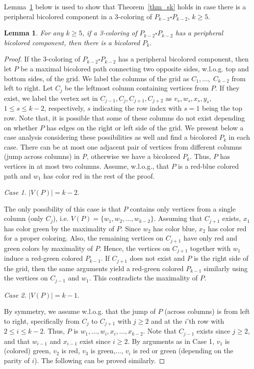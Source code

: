 \documentclass[
final, nomarks
]{dmtcs-episciences}
\newtheorem{lemma}[theorem]{Lemma}
\begin{document}
Lemma~\ref{lem-case1} below is used to show  that Theorem~\ref{thm_sk} holds in case there is  a peripheral bicolored component in a 3-coloring of $P_{k-2}\square P_{k-2}$, $k\geq 5$. 

\begin{lemma}\label{lem-case1}
    For any $k\geq 5$, if a 3-coloring of $P_{k-2}\square P_{k-2}$ has a peripheral bicolored component, then there is a bicolored $P_k$. 
\end{lemma}
\begin{proof}
If the 3-coloring of $P_{k-2}\square P_{k-2}$ has a peripheral bicolored component, then let $P$ be a maximal bicolored path connecting two opposite sides, w.l.o.g. top and bottom sides, of the grid. 
We label the columns of the grid as $C_1,\dots,$ $C_{k-2}$ from left to right. Let $C_j$ be the leftmost column containing vertices from $P$. 
If they exist, we label the vertex set in $C_{j-1}, C_j, C_{j+1}, C_{j+2}$ as $v_s, w_s, x_s, y_s,$ $1\leq s\leq k-2$, respectively, $s$ indicating the row index with $s=1$ being the top row. Note that, it is possible that some of these columns do not exist depending on whether $P$ has edges on the right or left side of the grid. We present below a case analysis considering these possibilities as well and find a bicolored $P_k$ in each case. There can be at most one adjacent pair of vertices from different columns (jump across columns) in {\it P}, otherwise we have a bicolored $P_k.$ Thus, $P$ has vertices in at most two columns. Assume, w.l.o.g., that $P$ is a red-blue colored path and $w_1$ has color red in the rest of the proof.  
 

\noindent
{\it Case 1.} $|V(P)|=k-2.$ 

The only possibility of this case is that $P$ contains only vertices from a single column (only $C_j$), i.e. $V(P)=\{w_1,w_2, \dots, w_{k-2}\}.$ Assuming that $C_{j+1}$ exists, $x_1$ has color green by the maximality of $P$. 
Since $w_2$ has color blue, $x_2$ has color red for a proper coloring. Also, the remaining vertices on $C_{j+1}$ have only red and green colors by maximality of $P$. Hence, the vertices on $C_{j+1}$ together with $w_1$ induce a red-green colored $P_{k-1}$. If $C_{j+1}$ does not exist and $P$ is the right side of the grid, then the same arguments yield a red-green colored $P_{k-1}$ similarly using the vertices on $C_{j-1}$ and $w_1.$ This contradicts the maximality of $P.$ 

\noindent
{\it Case 2.} $|V(P)|=k-1.$ 

By symmetry, we assume w.l.o.g. that the jump of $P$ (across columns) is from left to right, specifically from $C_j$ to $C_{j+1}$ with $j\geq 2$ and at the $i$'th row with $2\leq i\leq k-2.$ Thus, $P$ is $w_1, \dots, w_i, x_i, \dots, x_{k-2}.$ 
Note that $C_{j-1}$ exists since $j\geq 2$, and that $w_{i-1}$ and $x_{i-1}$ exist since $i\geq 2.$ By arguments as in Case 1, $v_1$ is (colored) green, $v_2$ is red, $v_3$ is green,..., $v_i$ is red or green (depending on the parity of $i$). The following can be proved similarly. 


\end{proof}
\end{document}

